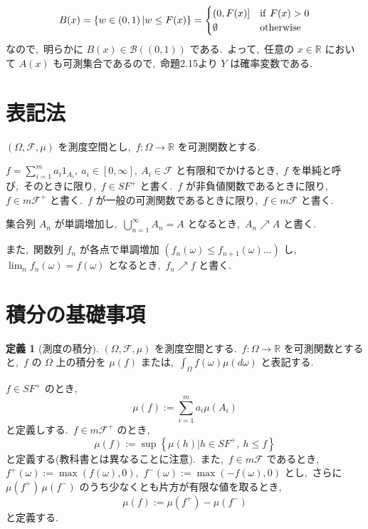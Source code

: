 \documentclass[a4j,11pt]{jarticle}
\theoremstyle{definition}
\newtheorem{definition}[theorem]{定義}
\begin{document}
\begin{equation}
  B(x) = \left\{ w  \in\left( 0,1\right) | w \leq F(x)\right\} = 
  \begin{cases}
    \left( 0, F(x)\right] & {\rm if } \ F(x) > 0 \\
    \emptyset & {\rm otherwise}
  \end{cases}
\end{equation}
なので,\ 明らかに
$B(x) \in \mathcal{B}((0,1))$
である.\ 
よって,\ 任意の
$x\in \mathbb{R}$
において
$A(x)$
も可測集合であるので,\ 命題2.15より
$Y$
は確率変数である.\ 


\section*{表記法}
  $(\Omega,\mathcal{F},\mu)$
  を測度空間とし,\ 
  $f:\Omega \to \mathbb{R}$
  を可測関数とする.\ 

  $f = \sum_{i=1}^m a_i 1_{A_i},\ a_i \in \left[ 0, \infty\right],\ A_i \in \mathcal{F}$
  と有限和でかけるとき,\ 
  $f$
  を単純と呼び,\ そのときに限り,\ 
  $f \in SF^+$
  と書く.\ 
  $f$
  が非負値関数であるときに限り,\ 
  $f \in m\mathcal{F}^+$
  と書く.\ 
  $f$
  が一般の可測関数であるときに限り,\ 
  $f \in m\mathcal{F}$
  と書く.\ 

  集合列
  $A_n$
  が単調増加し,\ 
  $\bigcup_{n=1}^{\infty} A_n = A$
  となるとき,\ 
  $A_n \nearrow A$
  と書く.\ 

  また,\ 関数列
  $f_n$
  が各点で単調増加
  $(f_n(\omega) \leq f_{n+1}(\omega) \ldots)$
  し,\ 
  $\lim_{n} f_n(\omega) = f(\omega)$
  となるとき,\ 
  $f_n \nearrow f$
  と書く.\ 

\section*{積分の基礎事項}
\begin{definition}[測度の積分]
  $(\Omega,\mathcal{F},\mu)$
  を測度空間とする.\ 
  $f:\Omega \to \mathbb{R}$
  を可測関数とすると,\ 
  $f$
  の
  $\Omega$
  上の積分を
  $\mu (f)$
  または,\ 
  $\int_{\Omega} f(\omega) \mu (d\omega)$
  と表記する.\ 

  $f \in SF^+$
  のとき,\ 
  \begin{equation}
    \mu (f) := \sum_{i=1}^m a_i \mu(A_i)
  \end{equation}
  と定義しする.\  
  $f \in m\mathcal{F}^+$
  のとき,\ 
  \begin{equation}
    \mu(f) := \sup\left\{ \mu(h) | h \in SF^+,\ h \leq f\right\}
  \end{equation}
  と定義する(教科書とは異なることに注意).\ 
  また,\ 
  $f\in m\mathcal{F}$
  であるとき,\ 
  $f^+(\omega) := \max(f(\omega),0)$,\ 
  $f^-(\omega) := \max(-f(\omega),0)$
  とし,\ さらに
  $\mu(f^+)\, \mu(f^-)$
  のうち少なくとも片方が有限な値を取るとき,\ 
  \begin{equation}
    \mu(f) := \mu(f^+) - \mu(f^-)
  \end{equation}
  と定義する.\ 
\end{definition}
\end{document}
